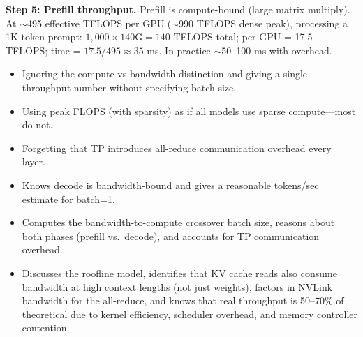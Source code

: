 \begin{interviewq}
\textbf{Step 5: Prefill throughput.} Prefill is compute-bound (large matrix multiply). At $\sim$495 effective TFLOPS per GPU ($\sim$990 TFLOPS dense peak), processing a 1K-token prompt: $1{,}000 \times 140\text{G} = 140$ TFLOPS total; per GPU = 17.5 TFLOPS; time = $17.5 / 495 \approx 35$ ms. In practice $\sim$50--100 ms with overhead.

\redflags
\begin{itemize}
    \item Ignoring the compute-vs-bandwidth distinction and giving a single throughput number without specifying batch size.
    \item Using peak FLOPS (with sparsity) as if all models use sparse compute---most do not.
    \item Forgetting that TP introduces all-reduce communication overhead every layer.
\end{itemize}


\goodgreat
\begin{itemize}
    \item {} Knows decode is bandwidth-bound and gives a reasonable tokens/sec estimate for batch=1.
    \item {} Computes the bandwidth-to-compute crossover batch size, reasons about both phases (prefill vs.\ decode), and accounts for TP communication overhead.
    \item {} Discusses the roofline model, identifies that KV cache reads also consume bandwidth at high context lengths (not just weights), factors in NVLink bandwidth for the all-reduce, and knows that real throughput is 50--70\% of theoretical due to kernel efficiency, scheduler overhead, and memory controller contention.
\end{itemize}

\end{interviewq}


